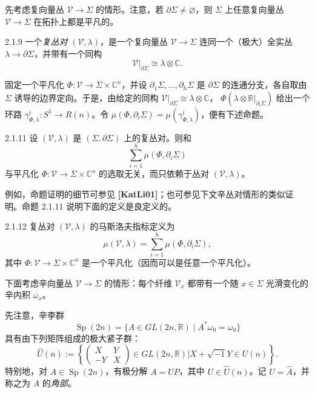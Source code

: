 先考虑复向量丛 $\mathcal V\to\Sigma$ 的情形。注意，若
$\partial\Sigma\ne\varnothing$，则 $\Sigma$ 上任意复向量丛
$\mathcal V\to\Sigma$ 在拓扑上都是平凡的。

\begin{definition}{2.1.9}\label{def:2-1-9}
一个\emph{复丛对} $(\mathcal V,\lambda)$，是一个复向量丛
$\mathcal V\to\Sigma$ 连同一个（极大）全实丛
$\lambda\to\partial\Sigma$，并带有一个同构
\begin{equation}
  \mathcal V|_{\partial\Sigma}\cong\lambda\otimes\mathbb C.
  \tag{2.1.10}\label{eq:2-1-10}
\end{equation}
\end{definition}

固定一个平凡化 $\Phi:\mathcal V\to\Sigma\times\mathbb C^n$，并设
$\partial_1\Sigma,\ldots,\partial_h\Sigma$ 是 $\partial\Sigma$ 的连通分支，各自取由
$\Sigma$ 诱导的边界定向。于是，由给定的同构
$\mathcal V|_{\partial\Sigma}\cong\lambda\otimes\mathbb C$，
$\Phi(\lambda\otimes\mathbb R|_{\partial_i\Sigma})$ 给出一个环路
$\gamma^i_{\Phi,\lambda}:S^1\to R(n)$。令
$\mu(\Phi,\partial_i\Sigma)=\mu(\gamma^i_{\Phi,\lambda})$，便有下述命题。

\begin{proposition}{2.1.11}\label{prop:2-1-11}
设 $(\mathcal V,\lambda)$ 是 $(\Sigma,\partial\Sigma)$ 上的复丛对。则和
\[
  \sum_{i=1}^h\mu(\Phi,\partial_i\Sigma)
\]
与平凡化 $\Phi:\mathcal V\to\Sigma\times\mathbb C^n$ 的选取无关，而只依赖于丛对
$(\mathcal V,\lambda)$。
\end{proposition}

例如，命题证明的细节可参见 \textbf{[KatLi01]}；也可参见下文辛丛对情形的类似证明。命题 2.1.11 说明下面的定义是良定义的。

\begin{definition}{2.1.12}\label{def:2-1-12}
复丛对 $(\mathcal V,\lambda)$ 的马斯洛夫指标定义为
\[
  \mu(\mathcal V,\lambda)
  =\sum_{i=1}^h\mu(\Phi,\partial_i\Sigma),
\]
其中 $\Phi:\mathcal V\to\Sigma\times\mathbb C^n$ 是一个平凡化（因而可以是任意一个平凡化）。
\end{definition}

下面考虑辛向量丛 $\mathcal V\to\Sigma$ 的情形：每个纤维
$\mathcal V_x$ 都带有一个随 $x\in\Sigma$ 光滑变化的辛内积 $\omega_x$。

先注意，辛李群
\[
  \operatorname{Sp}(2n)
  =\{A\in GL(2n,\mathbb R)\mid A^*\omega_0=\omega_0\}
\]
具有由下列矩阵组成的极大紧子群：
\[
  \widehat U(n)
  :=\left\{
    \begin{pmatrix}X&Y\\-Y&X\end{pmatrix}
    \in GL(2n,\mathbb R)
    \mathrel{\Big|}X+\sqrt{-1}Y\in U(n)
  \right\}.
\]
特别地，对 $A\in\operatorname{Sp}(2n)$，有极分解 $A=UP$，其中
$U\in\widehat U(n)$。记 $U=\widehat A$，并称之为 $A$ 的\emph{角部}。

